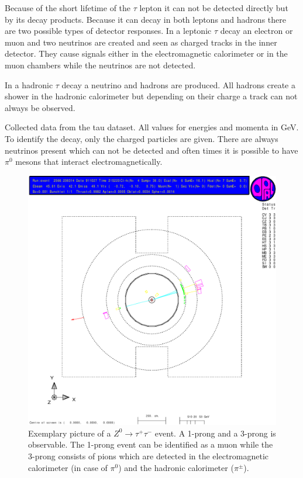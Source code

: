 \documentclass[11pt, a4paper]{article}
\numberwithin{equation}{section}
\begin{document}
Because of the short lifetime of the $\tau$ lepton it can not be detected directly but by its decay products.
Because it can decay in both leptons and hadrons there are two possible types of detector responses.
In a leptonic $\tau$ decay an electron or muon and two neutrinos are created and seen as charged tracks in the inner detector.
They cause signals either in the electromagnetic calorimeter or in the muon chambers while the neutrinos are not detected.

In a hadronic $\tau$ decay a neutrino and hadrons are produced.
All hadrons create a shower in the hadronic calorimeter but depending on their charge a track can not always be observed.
\begin{table}
	\centering
	\resizebox{\textwidth}{!}{
		
	}
	\caption{Collected data from the tau dataset. All values for energies and momenta in \si{GeV}. To identify the decay, only the charged particles are given. There are always neutrinos present which can not be detected and often times it is possible to have $\pi^0$ mesons that interact electromagnetically.}
\end{table}
\begin{figure}[h]
	\centering
	\includegraphics[width=\textwidth]{./data/tag1/tt_pics/cropped/tt_05}
	\caption{Exemplary picture of a $Z^0\rightarrow \tau^+\tau^-$ event. A 1-prong and a 3-prong is observable. The 1-prong event can be identified as a muon while the 3-prong consists of pions which are detected in the electromagnetic calorimeter (in case of $\pi^0$) and the hadronic calorimeter ($\pi^\pm$).}
\end{figure}
\clearpage
\end{document}

